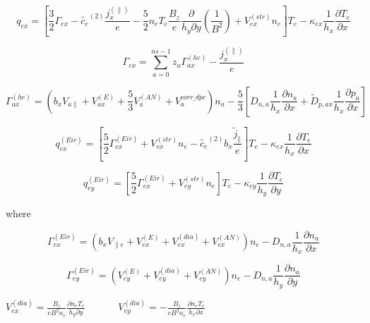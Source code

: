 \documentclass[a4paper,10pt]{report}
\begin{document}
\begin{equation*}
q_{ex} =
\left[
	\frac 3 2 \Gamma_{ex} - \widetilde{c_e}^{(2)} \frac{j^{\left( \parallel \right) }_x} e
	-
	\frac 5 2 n_e T_e \frac{B_z}e \frac{\partial}{h_y\partial y} \left( \frac 1{B^2} \right) +
	V_{ex}^{(str)} n_e
\right] T_e
-
\kappa_{ex} \frac 1{h_x} \frac{\partial T_e}{\partial x}
\end{equation*}

\begin{equation*}
\Gamma_{ex} = \sum \limits_{a=0}^{ns-1} z_a \Gamma_{ax}^{(he)} - \frac{j^{\left( \parallel \right)}_x} e
\end{equation*}

\begin{equation*}
\Gamma_{ax}^{(he)} =
\left(
	b_x V_{a \parallel} + V_{ax}^{(E)} + \frac 5 3 V_a^{(AN)} + V_a^{corr\_dpc}
\right) n_a -
\frac 5 3 \left[
	D_{n,a} \frac 1{h_x} \frac{\partial n_a}{\partial x} + \widetilde{D}_{p,ax} \frac{1}{h_x} \frac{\partial p_a}{\partial x}
\right]
\end{equation*}

\begin{equation*}
q_{ex}^{(Eir)} =
\left[
	\frac 5 2 \Gamma_{ex}^{(Eir)} + V_{ex}^{(str)}n_e
	- \widetilde{c_e}^{(2)} b_x \frac{\widetilde j_{\parallel}} e
\right] T_e -
\kappa_{ex} \frac 1{h_x} \frac{\partial T_e}{\partial x}
\end{equation*}

\begin{equation*}
q_{ey}^{(Eir)} =
\left[
	\frac 5 2 \Gamma_{ex}^{(Eir)} + V_{ey}^{(str)}n_e
\right] T_e -
\kappa_{ey} \frac 1{h_y} \frac{\partial T_e}{\partial y}
\end{equation*}

where

\begin{equation*}
\Gamma_{ex}^{(Eir)} =
\left(
	b_x V_{\parallel e} + V_{ex}^{(E)} + V_{ex}^{(dia)} + V_{ex}^{(AN)}
\right) n_e -
D_{n,a} \frac 1{h_x} \frac{\partial n_a}{\partial x}
\end{equation*}

\begin{equation*}
\Gamma_{ey}^{(Eir)} =
\left(
	V_{ey}^{(E)} + V_{ey}^{(dia)} + V_{ey}^{(AN)}
\right) n_e -
D_{n,a} \frac 1{h_y} \frac{\partial n_a}{\partial y}
\end{equation*}

$V_{ex}^{(dia)} = \frac{B_z}{e B^2 n_e} \frac{\partial n_e T_e}{h_y \partial y}$ \ \ \ \ \ \
$V_{ey}^{(dia)} = -\frac{B_z}{e B^2 n_e} \frac{\partial n_e T_e}{h_x \partial x}$
\end{document}
